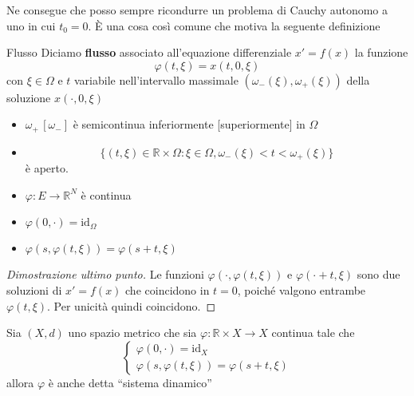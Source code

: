 Ne consegue che posso sempre ricondurre un problema di Cauchy autonomo a uno in
cui \(t_{0} = 0\). È una cosa così comune che motiva la seguente definizione

\begin{definition}{Flusso}
    Diciamo \textbf{flusso} associato all'equazione differenziale \(x' = f
    {(x)}\) la funzione
    \[
        \varphi {(t, \xi)} = x{(t , 0, \xi)}
    \]
    con \(\xi \in \Omega\) e \( t\) variabile nell'intervallo massimale
    \({(\omega_-{(\xi)}, \omega_+{(\xi)})}\) della soluzione \(x{(\cdot , 0, \xi)}\) 
\end{definition}

\begin{proposition}\label{prop:flusso}
    \begin{itemize}
    \item \(\omega_+\, [\omega_-]\) è semicontinua inferiormente [superiormente] in
    \(\Omega\)
\item \[
        \{{(t, \xi)} \in \mathbb{R} \times \Omega : \xi \in \Omega,
        \omega_-{(\xi)} < t < \omega_+{(\xi)}\} 
    \]
    è aperto.

\item \(\varphi : E \to \mathbb{R}^{N}\) è continua

\item \(\varphi {(0, \cdot )} = \text{id}_\Omega\) 

\item \(\varphi {(s, \varphi {(t, \xi)})} = \varphi {(s+t, \xi)}\) 
    \end{itemize}
\end{proposition}
    
\begin{proof}[Dimostrazione ultimo punto]
    Le funzioni \(\varphi {(\cdot , \varphi {(t, \xi)})}\)  e \(\varphi {(\cdot
    +t, \xi)}\) sono due soluzioni di \(x'=f{(x)}\) che coincidono in \(t = 0\),
    poiché valgono entrambe \(\varphi {(t, \xi)}\). Per unicità quindi
    coincidono.
\end{proof}

\begin{remark}
    Sia \({(X, d)}\) uno spazio metrico che sia \(\varphi : \mathbb{R} \times X
    \to X\) continua tale che
    \[
        \begin{cases}
            \varphi {(0, \cdot )} = \text{id}_X \\
            \varphi {(s, \varphi {(t, \xi)})} = \varphi {(s+t, \xi)}
        \end{cases}
    \]
    allora \(\varphi \) è anche detta ``sistema dinamico''
\end{remark}

